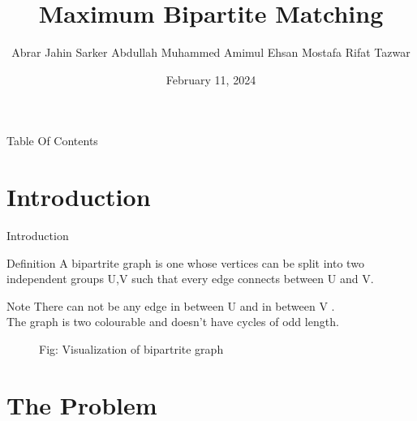 \documentclass{beamer}
\title{Maximum Bipartite Matching}
\author[Jahin $(2005012)$, Amim $(2005017)$ \& Tazwar $(2005020)$]
{Abrar Jahin Sarker\inst{1} \newline Abdullah  Muhammed  Amimul Ehsan\inst{2} \newline Mostafa Rifat Tazwar\inst{3}}
\institute[VFU] %
{
  \inst{1}$2005012$
  \and
  \inst{2}$2005017$
  \and
  \inst{3}$2005020$
  \and
  \inst{1,2,3}Department of Computer Science and Technology, BUET
}
\date{February 11, 2024}
\begin{document}
\begin{frame}
    \titlepage
\end{frame}

\begin{frame}{Table Of Contents}
    \tableofcontents
\end{frame}


\section{Introduction}
\begin{frame}{Introduction}
    

\begin{block}{Definition}
    A bipartrite graph is one whose vertices can be split into two independent groups U,V such that every edge connects between U and V.
\end{block}
\begin{alertblock}{Note}
 There can not be any edge in between U and in between V .\\
     The graph is two colourable and doesn't have  cycles of odd length.

\end{alertblock}

    \begin{figure}
        \centering
        \caption{Fig: Visualization of bipartrite graph}
    \end{figure}

\end{frame}
    


\section{The Problem}
\end{document}

